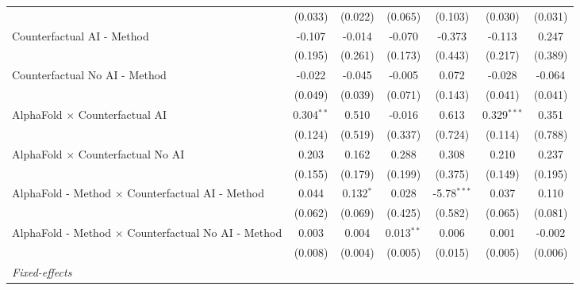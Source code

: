 \begin{tabular}{lcccccc}
                                                              & (0.033)       & (0.022)        & (0.065)      & (0.103)       & (0.030)       & (0.031)\\   
   Counterfactual AI - Method                                 & -0.107        & -0.014         & -0.070       & -0.373        & -0.113        & 0.247\\   
                                                              & (0.195)       & (0.261)        & (0.173)      & (0.443)       & (0.217)       & (0.389)\\   
   Counterfactual No AI - Method                              & -0.022        & -0.045         & -0.005       & 0.072         & -0.028        & -0.064\\   
                                                              & (0.049)       & (0.039)        & (0.071)      & (0.143)       & (0.041)       & (0.041)\\   
   AlphaFold $\times$ Counterfactual AI                       & 0.304$^{**}$  & 0.510          & -0.016       & 0.613         & 0.329$^{***}$ & 0.351\\   
                                                              & (0.124)       & (0.519)        & (0.337)      & (0.724)       & (0.114)       & (0.788)\\   
   AlphaFold $\times$ Counterfactual No AI                    & 0.203         & 0.162          & 0.288        & 0.308         & 0.210         & 0.237\\   
                                                              & (0.155)       & (0.179)        & (0.199)      & (0.375)       & (0.149)       & (0.195)\\   
   AlphaFold - Method $\times$ Counterfactual AI - Method     & 0.044         & 0.132$^{*}$    & 0.028        & -5.78$^{***}$ & 0.037         & 0.110\\   
                                                              & (0.062)       & (0.069)        & (0.425)      & (0.582)       & (0.065)       & (0.081)\\   
   AlphaFold - Method $\times$ Counterfactual No AI - Method  & 0.003         & 0.004          & 0.013$^{**}$ & 0.006         & 0.001         & -0.002\\   
                                                              & (0.008)       & (0.004)        & (0.005)      & (0.015)       & (0.005)       & (0.006)\\   
   \midrule
   \emph{Fixed-effects}\\

\end{tabular}
